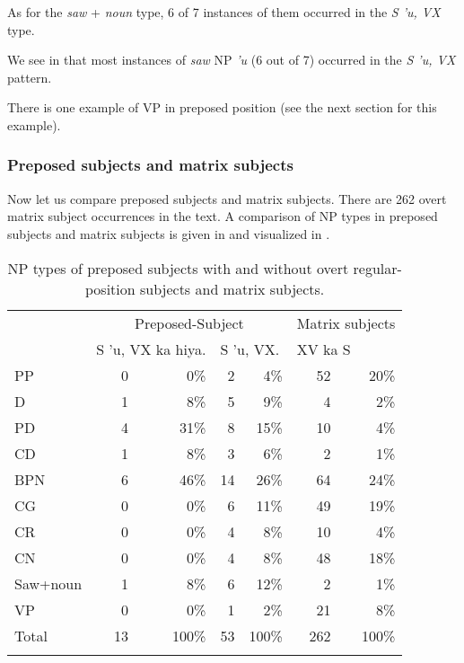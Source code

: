 \documentclass[output=paper
,modfonts
,nonflat]{langsci/langscibook}
\begin{document}
As for the \textit{saw} + \textit{noun} type, 6 of 7 instances of them occurred in the \textit{S 'u, VX} type. 

We see in  that most instances of \textit{saw} NP \textit{'u} (6 out of 7) occurred in the \textit{S 'u, VX} pattern. 

There is one example of VP in preposed position (see the next section for this example).

\subsubsection{\label{s:tsukida:3.3.2}Preposed subjects and matrix subjects}

Now let us compare preposed subjects and matrix subjects. There are 262 overt matrix subject occurrences in the text. A comparison of NP types in preposed subjects and matrix subjects is given in  and visualized in .

\begin{table}
\begin{tabularx}{\textwidth}{Xrrrrrr} 
	\lsptoprule
	& \multicolumn{4}{c}{Preposed-Subject} & \multicolumn{2}{c}{Matrix \isi{clause} subjects}\\ \cmidrule{2-5}
	& \multicolumn{2}{l}{S 'u, VX ka hiya.} & \multicolumn{2}{l}{S 'u, VX.} & \multicolumn{2}{l}{ XV ka S}\\
	\midrule
	 PP &  0 &  0\% &  2 &  4\% &  52 &  20\%\\
	 \midrule
	 D &  1 &  8\% &  5 &  9\% &  4 &  2\%\\
	 PD &  4 &  31\% &  8 &  15\% &  10 &  4\%\\
	 CD &  1 &  8\% &  3 &  6\% &  2 &  1\%\\
	 BPN &  6 &  46\% &  14 &  26\% &  64 &  24\%\\
	 \midrule
	 CG &  0 &  0\% &  6 &  11\% &  49 &  19\%\\
	 CR &  0 &  0\% &  4 &  8\% &  10 &  4\%\\
	 CN &  0 &  0\% &  4 &  8\% &  48 &  18\%\\
	 \midrule
	 Saw+noun &  1 &  8\% &  6 &  12\% &  2 &  1\%\\
	 \midrule
	 VP &  0 &  0\% &  1 &  2\% &  21 &  8\%\\
	 \midrule
	 Total &  13 &  100\% &  53 &  100\% &  262 &  100\%\\
	\lspbottomrule
\end{tabularx}
	\caption{NP types of preposed subjects with and without overt regular-position subjects and matrix subjects.}
	\label{tab:tsukida:5}
\end{table}
\end{document}
